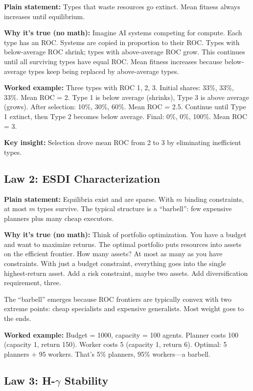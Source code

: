 \documentclass[12pt]{article}
\begin{document}
\textbf{Plain statement:} Types that waste resources go extinct. Mean fitness always increases until equilibrium.

\textbf{Why it's true (no math):} Imagine AI systems competing for compute. Each type has an ROC. Systems are copied in proportion to their ROC. Types with below-average ROC shrink; types with above-average ROC grow. This continues until all surviving types have equal ROC. Mean fitness increases because below-average types keep being replaced by above-average types.

\textbf{Worked example:} Three types with ROC 1, 2, 3. Initial shares: 33\%, 33\%, 33\%. Mean ROC = 2. Type 1 is below average (shrinks), Type 3 is above average (grows). After selection: 10\%, 30\%, 60\%. Mean ROC = 2.5. Continue until Type 1 extinct, then Type 2 becomes below average. Final: 0\%, 0\%, 100\%. Mean ROC = 3.

\textbf{Key insight:} Selection drove mean ROC from 2 to 3 by eliminating inefficient types.

\subsection{Law 2: ESDI Characterization}

\textbf{Plain statement:} Equilibria exist and are sparse. With $m$ binding constraints, at most $m$ types survive. The typical structure is a ``barbell'': few expensive planners plus many cheap executors.

\textbf{Why it's true (no math):} Think of portfolio optimization. You have a budget and want to maximize returns. The optimal portfolio puts resources into assets on the efficient frontier. How many assets? At most as many as you have constraints. With just a budget constraint, everything goes into the single highest-return asset. Add a risk constraint, maybe two assets. Add diversification requirement, three.

The ``barbell'' emerges because ROC frontiers are typically convex with two extreme points: cheap specialists and expensive generalists. Most weight goes to the ends.

\textbf{Worked example:} Budget = 1000, capacity = 100 agents. Planner costs 100 (capacity 1, return 150). Worker costs 5 (capacity 1, return 6). Optimal: 5 planners + 95 workers. That's 5\% planners, 95\% workers---a barbell.

\subsection{Law 3: H-$\gamma$ Stability}
\end{document}
